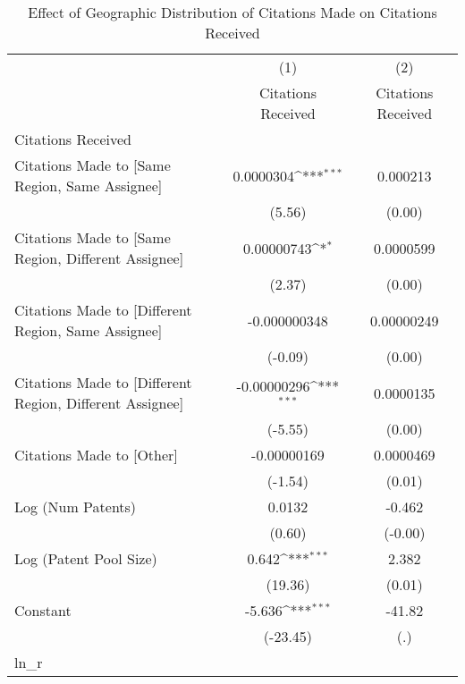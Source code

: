 {
\def\sym#1{\ifmmode^{#1}\else\(^{#1}\)\fi}
\begin{longtable}{l*{2}{c}}
\caption{Effect of Geographic Distribution of Citations Made on Citations Received \label{eflowsreg}}\\
\hline\hline\endfirsthead\hline\endhead\hline\endfoot\endlastfoot
                    &\multicolumn{1}{c}{(1)}&\multicolumn{1}{c}{(2)}\\
                    &\multicolumn{1}{c}{Citations Received}&\multicolumn{1}{c}{Citations Received}\\
\hline
Citations Received  &                     &                     \\
Citations Made to [Same Region, Same Assignee]&   0.0000304\sym{***}&    0.000213         \\
                    &      (5.56)         &      (0.00)         \\
[1em]
Citations Made to [Same Region, Different Assignee]&  0.00000743\sym{*}  &   0.0000599         \\
                    &      (2.37)         &      (0.00)         \\
[1em]
Citations Made to [Different Region, Same Assignee]&-0.000000348         &  0.00000249         \\
                    &     (-0.09)         &      (0.00)         \\
[1em]
Citations Made to [Different Region, Different Assignee]& -0.00000296\sym{***}&   0.0000135         \\
                    &     (-5.55)         &      (0.00)         \\
[1em]
Citations Made to [Other]& -0.00000169         &   0.0000469         \\
                    &     (-1.54)         &      (0.01)         \\
[1em]
Log (Num Patents)   &      0.0132         &      -0.462         \\
                    &      (0.60)         &     (-0.00)         \\
[1em]
Log (Patent Pool Size)&       0.642\sym{***}&       2.382         \\
                    &     (19.36)         &      (0.01)         \\
[1em]
Constant            &      -5.636\sym{***}&      -41.82         \\
                    &    (-23.45)         &         (.)         \\
\hline
ln\_r                &                     &                     \\

\end{longtable}}
